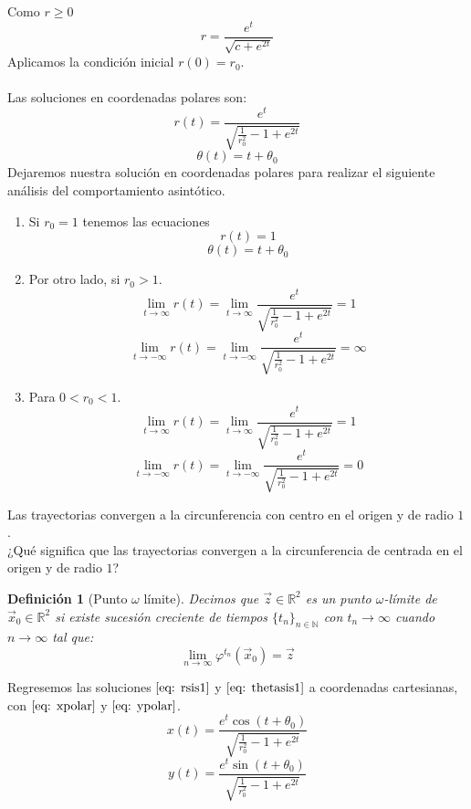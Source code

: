 \documentclass[12pt, a4paper]{report}
\newtheorem{definition}{Definición}
\begin{document}
Como $r\geq 0$
$$r=\frac{e^t}{\sqrt{c+e^{2t}}}$$
Aplicamos la condición inicial $r(0)=r_0$.\\
\\Las soluciones en coordenadas polares son:
\begin{equation}\label{eq: rsis1}
	r(t)=\frac{e^t}{\sqrt{\frac{1}{r_0^2}-1+e^{2t}}}
\end{equation}
\begin{equation}\label{eq: thetasis1}
	\theta(t)=t+\theta_0
\end{equation}
Dejaremos nuestra solución en coordenadas polares para realizar el siguiente
análisis del comportamiento asintótico.\\
\begin{enumerate}
	\item Si $r_0=1$ tenemos las ecuaciones
	      $$r(t)=1$$
	      $$\theta(t)=t+\theta_0$$
	\item Por otro lado, si $r_0>1$.
	      $$\lim_{t\to\infty}r(t)=\lim_{t\to\infty}\frac{e^t}{\sqrt{\frac{1}{r_0^2}-1+e^{2t}}}=1$$
	      $$\lim_{t\to-\infty}r(t)=\lim_{t\to-\infty}\frac{e^t}{\sqrt{\frac{1}{r_0^2}-1+e^{2t}}}=\infty$$
	\item Para $0<r_0<1$.
	      $$\lim_{t\to\infty}r(t)=\lim_{t\to\infty}\frac{e^t}{\sqrt{\frac{1}{r_0^2}-1+e^{2t}}}=1$$
	      $$\lim_{t\to-\infty}r(t)=\lim_{t\to-\infty}\frac{e^t}{\sqrt{\frac{1}{r_0^2}-1+e^{2t}}}=0$$
\end{enumerate}
Las trayectorias convergen a la circunferencia con centro en el origen
y de radio  $1$.\\

¿Qué significa que las trayectorias convergen a la circunferencia de centrada en el origen y de radio $1$?

\begin{definition} [Punto $\omega$ límite]
	Decimos que $\vec{z}\in\mathbb{R}^2$ es un punto $\omega$-límite
	de $\vec{x}_0\in\mathbb{R}^2$ si existe sucesión creciente de
	tiempos $\{t_n\}_{n\in\mathbb{N}}$
	con $t_n \to\infty$ cuando $n\to \infty$ tal que:
	$$\lim_{n\to\infty}\varphi^{t_n}(\vec{x}_0)=\vec{z}$$
\end{definition}

Regresemos las soluciones $\eqref{eq: rsis1}$ y $\eqref{eq: thetasis1}$ a
coordenadas cartesianas, con $\eqref{eq: xpolar}$ y $\eqref{eq: ypolar}$.
\begin{equation}\label{eq: xsis1}
	x(t)=\frac{e^t\cos(t+\theta_0)}{\sqrt{\frac{1}{r_0^2}-1+e^{2t}}}
\end{equation}
\begin{equation}\label{eq: ysis1}
	y(t)=\frac{e^t\sin(t+\theta_0)}{\sqrt{\frac{1}{r_0^2}-1+e^{2t}}}
\end{equation}
\end{document}
